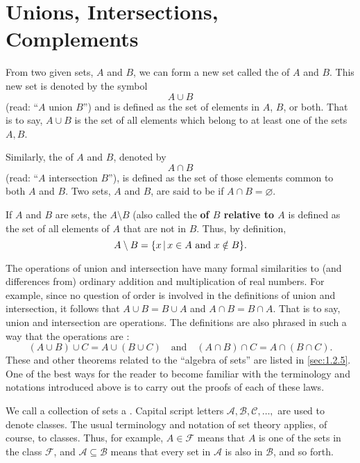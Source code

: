 \section{Unions, Intersections, Complements}\label{sec:1.2.4}

\begin{defn}\label{defn:1.2.7}
  From two given sets, \(A\) and \(B\), we can form a new set called the \textbf{} of \(A\) and \(B\).
  This new set is denoted by the symbol
  \[
    A \cup B
  \]
  (read: ``\(A\) union \(B\)'')
  and is defined as the set of elements in \(A\), \(B\), or both.
  That is to say, \(A \cup B\) is the set of all elements which belong to at least one of the sets \(A, B\).

  Similarly, the \textbf{} of \(A\) and \(B\), denoted by
  \[
    A \cap B
  \]
  (read: ``\(A\) intersection \(B\)''),
  is defined as the set of those elements common to both \(A\) and \(B\).
  Two sets, \(A\) and \(B\), are said to be \textbf{} if \(A \cap B = \varnothing\).

  If \(A\) and \(B\) are sets, the \textbf{} \(A \setminus B\) (also called the \textbf{ of \(B\) relative to \(A\)} is defined as the set of all elements of \(A\) that are not in \(B\).
  Thus, by definition,
  \[
    A \setminus B = \set{x \Mid x \in A \text{ and } x \notin B}.
  \]
\end{defn}

\begin{note}
  The operations of union and intersection have many formal similarities to (and differences from) ordinary addition and multiplication of real numbers.
  For example, since no question of order is involved in the definitions of union and intersection, it follows that \(A \cup B = B \cup A\) and \(A \cap B = B \cap A\).
  That is to say, union and intersection are \textbf{} operations.
  The definitions are also phrased in such a way that the operations are \textbf{}:
  \[
    (A \cup B) \cup C = A \cup (B \cup C) \quad \text{and} \quad (A \cap B) \cap C = A \cap (B \cap C).
  \]
  These and other theorems related to the ``algebra of sets'' are listed in \cref{sec:1.2.5}.
  One of the best ways for the reader to become familiar with the terminology and notations introduced above is to carry out the proofs of each of these laws.
\end{note}

\begin{defn}\label{defn:1.2.8}
  We call a collection of sets a \textbf{}.
  Capital script letters \(\mathcal{A}, \mathcal{B}, \mathcal{C}, \dots,\) are used to denote classes.
  The usual terminology and notation of set theory applies, of course, to classes.
  Thus, for example, \(A \in \mathcal{F}\) means that \(A\) is one of the sets in the class \(\mathcal{F}\), and \(\mathcal{A} \subseteq \mathcal{B}\) means that every set in \(\mathcal{A}\) is also in \(\mathcal{B}\), and so forth.
\end{defn}

